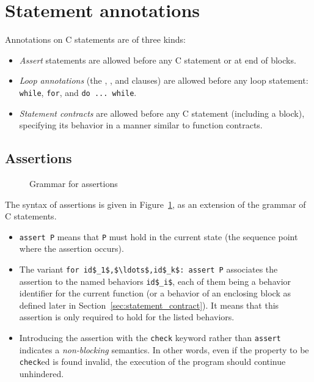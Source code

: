 
	
\section{Statement annotations}

Annotations on C statements are of three kinds:
\begin{itemize}
\item \emph{Assert} statements are allowed before any C statement or
  at end of blocks.
\item{}
  \emph{Loop annotations} (the \invariant, \assigns, and \variant clauses) are allowed
  before any loop statement: \lstinline|while|, \lstinline|for|, and
  \lstinline|do ... while|.
\item{}
  \emph{Statement contracts} are allowed before any C statement (including a block), specifying
  its behavior in a manner similar to function contracts.
\end{itemize}

\subsection{Assertions}
\label{sec:assertions}
\begin{figure}[t]
  \begin{cadre}
    
  \end{cadre}
  \caption{Grammar for assertions}
  \label{fig:gram:assertions}
\end{figure}

The syntax of assertions is given in Figure~\ref{fig:gram:assertions},
as an extension of the grammar of C statements.

\begin{itemize}
\item
  \lstinline|assert P|  means that \lstinline|P| must hold in the current state
  (the sequence point where the assertion occurs).

\item The variant \lstinline|for id$_1$,$\ldots$,id$_k$: assert P|
  associates the assertion to the named behaviors \lstinline|id$_i$|, each
  of them being a behavior identifier for the current function (or a
  behavior of an enclosing block as defined later in
  Section~\ref{sec:statement_contract}).  It means that this assertion
  is only required to hold for the listed behaviors.
\item Introducing the assertion with the \lstinline|check| keyword rather than \lstinline|assert| indicates a
  \emph{non-blocking} semantics. In other words, even if the property to be \lstinline|check|ed is found invalid,
  the execution of the program should continue unhindered.
\end{itemize}

